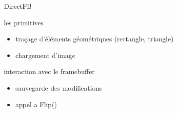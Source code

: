 
\begin{frame}{DirectFB }
	\begin{block} { les primitives }
		\begin{itemize}
			\item traçage d'éléments géométriques (rectangle, triangle)
			\item chargement d'image
		\end{itemize}
	\end{block}
	\begin{block} { interaction avec le framebuffer }
		 \begin{itemize}
		 	\item sauvegarde des modifications%
		 	\item appel a Flip() 
		 \end{itemize}
	\end{block}
\end{frame}
